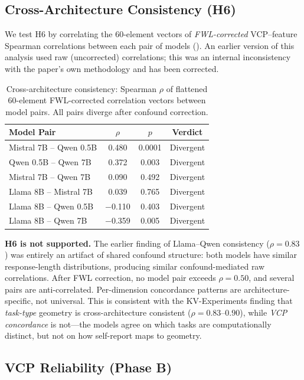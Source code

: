 \documentclass[11pt,a4paper]{article}
\begin{document}
\subsection{Cross-Architecture Consistency (H6)}

We test H6 by correlating the 60-element vectors of \emph{FWL-corrected} VCP--feature Spearman correlations between each pair of models (). An earlier version of this analysis used raw (uncorrected) correlations; this was an internal inconsistency with the paper's own methodology and has been corrected.

\begin{table}[H]
\centering
\caption{Cross-architecture consistency: Spearman $\rho$ of flattened 60-element FWL-corrected correlation vectors between model pairs. All pairs diverge after confound correction.}
\label{tab:cross_scale}
\begin{tabular}{lccc}
\toprule
\textbf{Model Pair} & $\rho$ & $p$ & \textbf{Verdict} \\
\midrule
Mistral 7B -- Qwen 0.5B & 0.480 & 0.0001 & Divergent \\
Qwen 0.5B -- Qwen 7B    & 0.372 & 0.003  & Divergent \\
Mistral 7B -- Qwen 7B   & 0.090 & 0.492  & Divergent \\
Llama 8B -- Mistral 7B  & 0.039 & 0.765  & Divergent \\
Llama 8B -- Qwen 0.5B   & $-$0.110 & 0.403 & Divergent \\
Llama 8B -- Qwen 7B     & $-$0.359 & 0.005 & Divergent \\
\bottomrule
\end{tabular}
\end{table}

\textbf{H6 is not supported.} The earlier finding of Llama--Qwen consistency ($\rho = 0.83$) was entirely an artifact of shared confound structure: both models have similar response-length distributions, producing similar confound-mediated raw correlations. After FWL correction, no model pair exceeds $\rho = 0.50$, and several pairs are anti-correlated. Per-dimension concordance patterns are architecture-specific, not universal. This is consistent with the KV-Experiments finding that \emph{task-type} geometry is cross-architecture consistent ($\rho = 0.83$--$0.90$), while \emph{VCP concordance} is not---the models agree on which tasks are computationally distinct, but not on how self-report maps to geometry.

\subsection{VCP Reliability (Phase B)}
\end{document}
